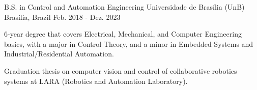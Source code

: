 

\begin{cventries}

  \cventry
    {B.S. in Control and Automation Engineering} %
    {Universidade de Brasília (UnB)} %
    {Brasília, Brazil} %
    {Feb. 2018 - Dez. 2023} %
    {
      \begin{cvitems} %
        \item {6-year degree that covers Electrical, Mechanical, and Computer Engineering basics, with a major in Control Theory, and a minor in Embedded Systems and Industrial/Residential Automation.}
        \item {Graduation thesis on computer vision and control of collaborative robotics systems at LARA (Robotics and Automation Laboratory).}
      \end{cvitems}
    }

\end{cventries}
